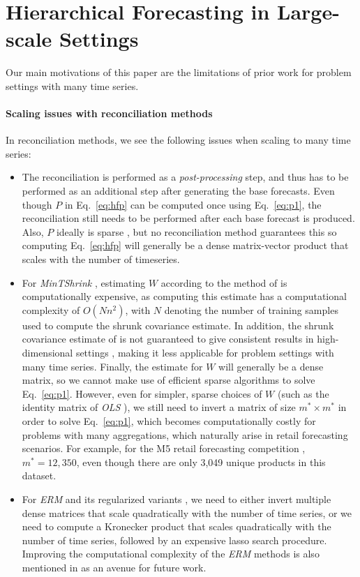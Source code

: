 \documentclass[preprint, 3p, times, twocolumn]{elsarticle}
\begin{document}
\section{Hierarchical Forecasting in Large-scale Settings}   \label{sec:ourwork}
Our main motivations of this paper are the limitations of prior work for problem settings with many time series.

\paragraph{Scaling issues with reconciliation methods}
In reconciliation methods, we see the following issues when scaling to many time series:
\begin{itemize}
  \item The reconciliation is performed as a \textit{post-processing} step, and thus has to be performed as an additional step after generating the base forecasts. Even though \(P\) in Eq.~\ref{eq:hfp} can be computed once using Eq.~\eqref{eq:p1}, the reconciliation still needs to be performed after each base forecast is produced. Also, \(P\) ideally is sparse \cite{bentaieb_regularized_2019}, but no reconciliation method guarantees this so computing Eq.~\ref{eq:hfp} will generally be a dense matrix-vector product that scales with the number of timeseries.
  \item For \textit{MinTShrink} \cite{wickramasuriya_optimal_2019}, estimating \(W\) according to the method of \cite{schafer_shrinkage_2005} is computationally expensive, as computing this estimate has a computational complexity of \(O(Nn^2)\), with \(N\) denoting the number of training samples used to compute the shrunk covariance estimate. In addition, the shrunk covariance estimate of \cite{schafer_shrinkage_2005} is not guaranteed to give consistent results in high-dimensional settings \cite{touloumis_nonparametric_2015}, making it less applicable for problem settings with many time series. Finally, the estimate for \(W\) will generally be a dense matrix, so we cannot make use of efficient sparse algorithms to solve Eq.~\eqref{eq:p1}. However, even for simpler, sparse choices of \(W\) (such as the identity matrix of \textit{OLS} \cite{hyndman_optimal_2011}), we still need to invert a matrix of size \(m^* \times m^*\) in order to solve Eq.~\eqref{eq:p1}, which becomes computationally costly for problems with many aggregations, which naturally arise in retail forecasting scenarios. For example, for the M5 retail forecasting competition \cite{makridakis_m5_2021}, \(m^*=12,350\), even though there are only 3,049 unique products in this dataset.  
  \item For \textit{ERM} and its regularized variants \cite{bentaieb_regularized_2019}, we need to either invert multiple dense matrices that scale quadratically with the number of time series, or we need to compute a Kronecker product that scales quadratically with the number of time series, followed by an expensive lasso search procedure. Improving the computational complexity of the \textit{ERM} methods is also mentioned in \cite{bentaieb_regularized_2019} as an avenue for future work.
\end{itemize}
\end{document}
